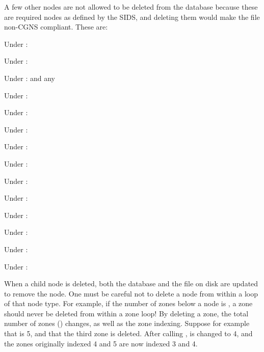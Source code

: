 A few other nodes are not allowed to be deleted from the database
because these are required nodes as defined by the SIDS, and deleting
them would make the file non-CGNS compliant.
These are:
\begin{itemize*}
\item Under :
\item Under :
\item Under :
       and any 
\item Under :
\item Under :
\item Under :
\item Under :
\item Under :
\item Under :
\item Under :
\item Under :
\item Under :
\item Under :
\item Under :
\end{itemize*}

When a child node is deleted, both the database and the file on disk are
updated to remove the node.
One must be careful not to delete a node from within a loop of that node
type.
For example, if the number of zones below a  node is
, a zone should never be deleted from within a zone loop!
By deleting a zone, the total number of zones () changes,
as well as the zone indexing.
Suppose for example that  is 5, and that the third zone
is deleted.
After calling ,  is changed to 4,
and the zones originally indexed 4 and 5 are now indexed 3 and 4.
